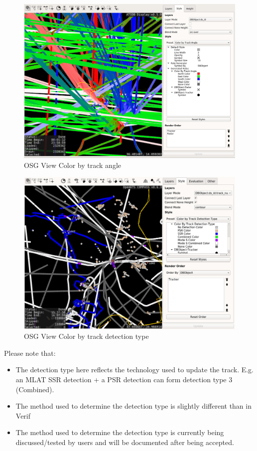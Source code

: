 \begin{figure}[H]
    \hspace*{-2.5cm}
    \includegraphics[width=19cm,frame]{figures/osgview_style_track_angle.png}
  \caption{OSG View Color by track angle}
\end{figure}

\begin{figure}[H]
    \hspace*{-2.5cm}
    \includegraphics[width=19cm,frame]{figures/osgview_style_tracker_detection_type.png}
  \caption{OSG View Color by track detection type}
\end{figure}

Please note that:
\begin{itemize}
 \item The detection type here reflects the technology used to update the track. E.g. an MLAT SSR detection + a PSR detection can form detection type 3 (Combined).
 \item The method used to determine the detection type is slightly different than in Verif
 \item The method used to determine the detection type is currently being discussed/tested by users and will be documented after being accepted.
\end{itemize}


